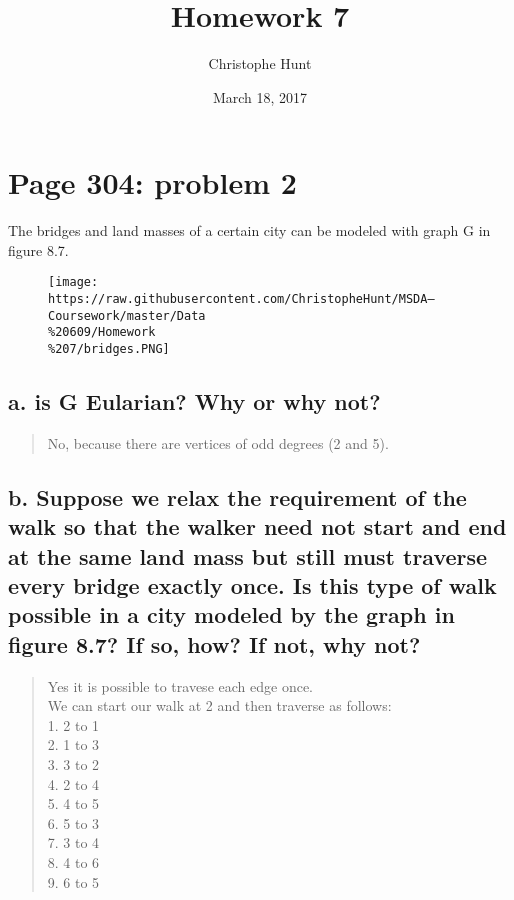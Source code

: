 \documentclass[]{article}
\title{Homework 7}
\author{Christophe Hunt}
\date{March 18, 2017}
\begin{document}
\maketitle

{
\setcounter{tocdepth}{2}
\tableofcontents
}
\newpage

\section{Page 304: problem 2}\label{page-304-problem-2}

The bridges and land masses of a certain city can be modeled with graph
G in figure 8.7.

\begin{figure}[htbp]
\centering
\texttt{[image: https://raw.githubusercontent.com/ChristopheHunt/MSDA---Coursework/master/Data\\\%20609/Homework\\\%207/bridges.PNG]}
\caption{}
\end{figure}

\subsection{a. is G Eularian? Why or why
not?}\label{a.-is-g-eularian-why-or-why-not}

\begin{quote}
No, because there are vertices of odd degrees (2 and 5).
\end{quote}

\subsection{b. Suppose we relax the requirement of the walk so that the
walker need not start and end at the same land mass but still must
traverse every bridge exactly once. Is this type of walk possible in a
city modeled by the graph in figure 8.7? If so, how? If not, why
not?}\label{b.-suppose-we-relax-the-requirement-of-the-walk-so-that-the-walker-need-not-start-and-end-at-the-same-land-mass-but-still-must-traverse-every-bridge-exactly-once.-is-this-type-of-walk-possible-in-a-city-modeled-by-the-graph-in-figure-8.7-if-so-how-if-not-why-not}

\begin{quote}
Yes it is possible to travese each edge once.\\
We can start our walk at 2 and then traverse as follows:\\
1. 2 to 1\\
2. 1 to 3\\
3. 3 to 2\\
4. 2 to 4\\
5. 4 to 5\\
6. 5 to 3\\
7. 3 to 4\\
8. 4 to 6\\
9. 6 to 5
\end{quote}
\end{document}
